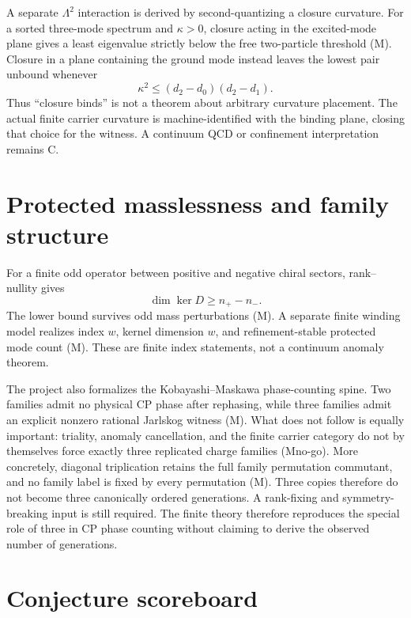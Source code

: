 \documentclass[11pt]{article}
\newcommand{\Mtag}{\textcolor{verified}{\textsc{M}}}
\newcommand{\Ctag}{\textcolor{conjectural}{\textsc{C}}}
\begin{document}
A separate $\Lambda^2$ interaction is derived by second-quantizing a closure
curvature.  For a sorted three-mode spectrum and $\kappa>0$, closure acting in
the excited-mode plane gives a least eigenvalue strictly below the free
two-particle threshold (\Mtag).  Closure in a plane containing the ground mode
instead leaves the lowest pair unbound whenever
\begin{equation}\label{eq:wrongplane}
 \kappa^2\leq(d_2-d_0)(d_2-d_1).
\end{equation}
Thus ``closure binds'' is not a theorem about arbitrary curvature placement.
The actual finite carrier curvature is machine-identified with the binding
plane, closing that choice for the witness.  A continuum QCD or confinement
interpretation remains \Ctag.

\section{Protected masslessness and family structure}

For a finite odd operator between positive and negative chiral sectors,
rank--nullity gives
\begin{equation}\label{eq:index}
 \dim\ker D\geq n_+-n_-.
\end{equation}
The lower bound survives odd mass perturbations (\Mtag).  A separate finite
winding model realizes index $w$, kernel dimension $w$, and refinement-stable
protected mode count (\Mtag).  These are finite index statements, not a
continuum anomaly theorem.

The project also formalizes the Kobayashi--Maskawa phase-counting spine.  Two
families admit no physical CP phase after rephasing, while three families admit
an explicit nonzero rational Jarlskog witness (\Mtag).  What does not follow is
equally important: triality, anomaly cancellation, and the finite carrier
category do not by themselves force exactly three replicated charge families
(\Mtag no-go).  More concretely, diagonal triplication retains the full family
permutation commutant, and no family label is fixed by every permutation
(\Mtag).  Three copies therefore do not become three canonically ordered
generations.  A rank-fixing and symmetry-breaking input is still required.  The finite theory
therefore reproduces the special role of three in CP phase counting without
claiming to derive the observed number of generations.

\section{Conjecture scoreboard}
\end{document}
